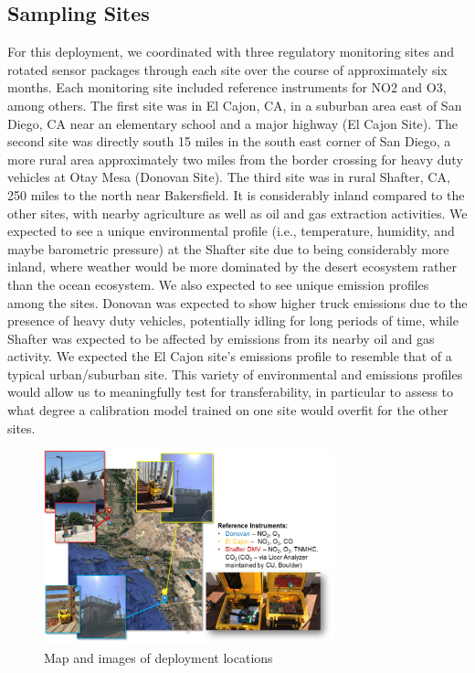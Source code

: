 \documentclass[journal abbreviation, manuscript]{copernicus}
\begin{document}
\subsection{Sampling Sites}\label{SamplingSites}
For this deployment, we coordinated with three regulatory monitoring sites and rotated sensor packages through each site over the course of approximately six months. Each monitoring site included reference instruments for NO2 and O3, among others. The first site was in El Cajon, CA, in a suburban area east of San Diego, CA near an elementary school and a major highway (El Cajon Site). The second site was directly south 15 miles in the south east corner of San Diego, a more rural area approximately two miles from the border crossing for heavy duty vehicles at Otay Mesa (Donovan Site). The third site was in rural Shafter, CA, 250 miles to the north near Bakersfield.  It is considerably inland compared to the other sites, with nearby agriculture as well as oil and gas extraction activities. We expected to see a unique environmental profile (i.e., temperature, humidity, and maybe barometric pressure) at the Shafter site due to being considerably more inland, where weather would be more dominated by the desert ecosystem rather than the ocean ecosystem.  We also expected to see unique emission profiles among the sites.  Donovan was expected to show higher truck emissions due to the presence of heavy duty vehicles, potentially idling for long periods of time, while Shafter was expected to be affected by emissions from its nearby oil and gas activity. We expected the El Cajon site's emissions profile to resemble that of a typical urban/suburban site.  This variety of environmental and emissions profiles would allow us to meaningfully test for transferability, in particular to assess to what degree a calibration model trained on one site would overfit for the other sites.

\begin{figure}[H]
\centering
\includegraphics[width=0.75\textwidth]{writeup/img/MSdeployment.png}
\caption{Map and images of deployment locations}
\label{fig:img-label}
\end{figure}
\end{document}
